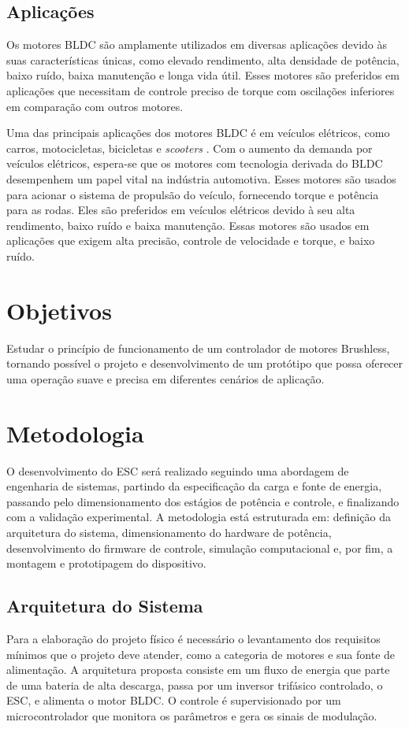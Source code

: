 \documentclass[12pt, a4paper, openright, oneside, brazilian]{abntex2}
\begin{document}
 \pagebreak 

 \section{Aplicações} 
 Os motores BLDC são amplamente utilizados em diversas aplicações devido às suas características únicas, como elevado rendimento, alta densidade de potência, baixo ruído, baixa manutenção e longa vida útil. Esses motores são preferidos em aplicações que necessitam de controle preciso de torque com oscilações inferiores em comparação com outros motores. 

 Uma das principais aplicações dos motores BLDC é em veículos elétricos, como carros, motocicletas, bicicletas e \textit{scooters} \cite{chau2007emerging}. Com o aumento da demanda por veículos elétricos, espera-se que os motores com tecnologia derivada do BLDC desempenhem um papel vital na indústria automotiva. Esses motores são usados para acionar o sistema de propulsão do veículo, fornecendo torque e potência para as rodas. Eles são preferidos em veículos elétricos devido à seu alta rendimento, baixo ruído e baixa manutenção. Essas motores são usados em aplicações que exigem alta precisão, controle de velocidade e torque, e baixo ruído.

\chapter{Objetivos}
Estudar o princípio de funcionamento de um controlador de motores Brushless, tornando possível o projeto e desenvolvimento de um protótipo que possa oferecer uma operação suave e precisa em diferentes cenários de aplicação.

\chapter{Metodologia}
O desenvolvimento do ESC será realizado seguindo uma abordagem de engenharia de sistemas, partindo da especificação da carga e fonte de energia, passando pelo dimensionamento dos estágios de potência e controle, e finalizando com a validação experimental. A metodologia está estruturada em: definição da arquitetura do sistema, dimensionamento do hardware de potência, desenvolvimento do firmware de controle, simulação computacional e, por fim, a montagem e prototipagem do dispositivo.

\section{Arquitetura do Sistema}
Para a elaboração do projeto físico é necessário o levantamento dos requisitos mínimos que o projeto deve atender, como a categoria de motores e sua fonte de alimentação. A arquitetura proposta consiste em um fluxo de energia que parte de uma bateria de alta descarga, passa por um inversor trifásico controlado, o ESC, e alimenta o motor BLDC. O controle é supervisionado por um microcontrolador que monitora os parâmetros e gera os sinais de modulação.
\end{document}
